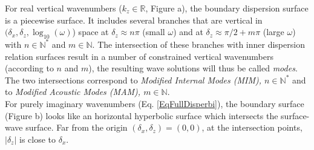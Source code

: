For real vertical wavenumbers ($k_z\in\mathbb{R}$, Figure a), the boundary dispersion surface is a piecewise surface. It includes several branches that are vertical in $(\delta_x, \delta_z, \log_{10}(\omega)$) space at $\delta_z \approx n\pi$ (small $\omega$) and at $\delta_z \approx \pi/2+m\pi$ (large $\omega$) with $n\in\mathbb{N}^\ast$ and $m\in\mathbb{N}$. The intersection of these branches with inner dispersion relation surfaces result in a number of constrained vertical wavenumbers (according to $n$ and $m$), the resulting wave solutions will thus be called {\it modes}. The two intersections correspond to {\it Modified Internal Modes (MIM),  $n\in\mathbb{N}^\ast$} and to {\it Modified Acoustic Modes (MAM), $m\in\mathbb{N}$}.\\
For purely imaginary wavenumbers (Eq. \ref{EqFullDisperbi}), the boundary surface (Figure b) looks like an horizontal hyperbolic surface which intersects the surface-wave surface. Far from the origin $(\delta_x,\delta_z)=(0,0)$, at the intersection points, $|\delta_z|$ is close to $\delta_x$.
